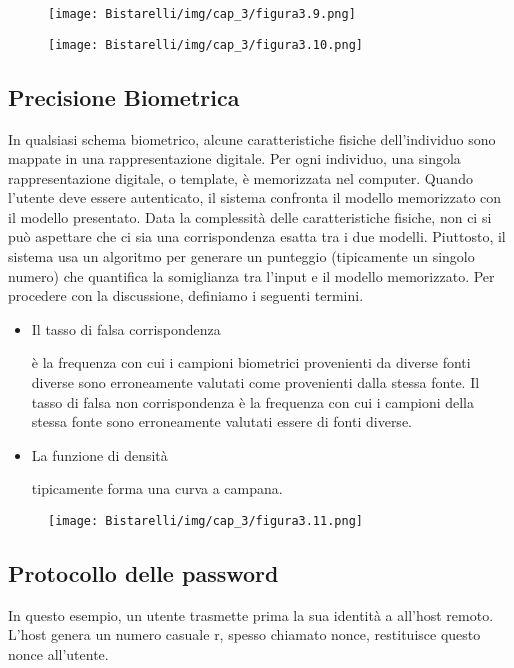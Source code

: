 \begin{figure}[H]
	\centering
    \texttt{[image: Bistarelli/img/cap\_3/figura3.9.png]}
\end{figure}

\begin{figure}[H]
	\centering
    \texttt{[image: Bistarelli/img/cap\_3/figura3.10.png]}
\end{figure}

\subsection{Precisione Biometrica}

In qualsiasi schema biometrico, alcune caratteristiche fisiche dell'individuo sono mappate in una rappresentazione digitale. Per ogni individuo, una singola rappresentazione digitale, o template, è memorizzata nel computer. Quando l'utente deve essere autenticato, il sistema confronta il modello memorizzato con il modello presentato. Data la complessità delle caratteristiche fisiche, non ci si può aspettare che ci sia una corrispondenza esatta tra i due modelli. Piuttosto, il sistema usa un algoritmo per generare un punteggio (tipicamente un singolo numero) che quantifica la somiglianza tra l'input e il modello memorizzato. Per procedere con la discussione, definiamo i seguenti termini.

\begin{itemize}
    \item Il tasso di falsa corrispondenza
    
    è la frequenza con cui i campioni biometrici provenienti da diverse fonti diverse sono erroneamente valutati come provenienti dalla stessa fonte. Il tasso di falsa non corrispondenza è la frequenza con cui i campioni della stessa fonte sono erroneamente valutati essere di fonti diverse.
    
    \item La funzione di densità
    
    tipicamente forma una curva a campana.
\end{itemize}
\begin{figure}[H]
	\centering
    \texttt{[image: Bistarelli/img/cap\_3/figura3.11.png]}
\end{figure}
\newpage
\subsection{Protocollo delle password}
In questo esempio, un utente trasmette prima la sua identità a all'host remoto. L'host genera un numero casuale r, spesso chiamato nonce, restituisce questo nonce all'utente.

